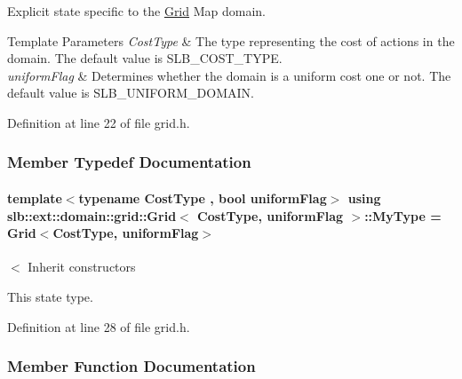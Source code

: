 Explicit state specific to the \hyperlink{structslb_1_1ext_1_1domain_1_1grid_1_1Grid}{Grid} Map domain. 


\begin{DoxyTemplParams}{Template Parameters}
{\em Cost\+Type} & The type representing the cost of actions in the domain. The default value is {\ttfamily S\+L\+B\+\_\+\+C\+O\+S\+T\+\_\+\+T\+Y\+PE}. \\
\hline
{\em uniform\+Flag} & Determines whether the domain is a uniform cost one or not. The default value is {\ttfamily S\+L\+B\+\_\+\+U\+N\+I\+F\+O\+R\+M\+\_\+\+D\+O\+M\+A\+IN}. \\
\hline
\end{DoxyTemplParams}


Definition at line 22 of file grid.\+h.



\subsubsection{Member Typedef Documentation}
\paragraph[{\texorpdfstring{My\+Type}{MyType}}]{\setlength{\rightskip}{0pt plus 5cm}template$<$typename Cost\+Type , bool uniform\+Flag$>$ using {\bf slb\+::ext\+::domain\+::grid\+::\+Grid}$<$ {\bf Cost\+Type}, uniform\+Flag $>$\+::{\bf My\+Type} =  {\bf Grid}$<${\bf Cost\+Type}, uniform\+Flag$>$}\hypertarget{structslb_1_1ext_1_1domain_1_1grid_1_1Grid_a03885678f7bc1ee3a2e408439e1ff3a5}{}\label{structslb_1_1ext_1_1domain_1_1grid_1_1Grid_a03885678f7bc1ee3a2e408439e1ff3a5}


$<$ Inherit constructors 

This state type. 

Definition at line 28 of file grid.\+h.



\subsubsection{Member Function Documentation}
